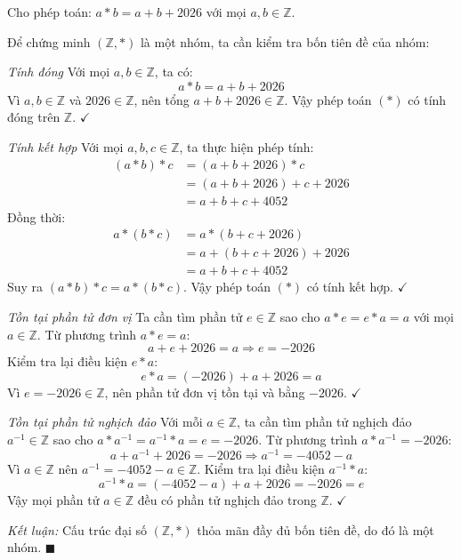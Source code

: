 \begin{solution}
Cho phép toán: $a * b = a + b + 2026$ với mọi $a, b \in \mathbb{Z}$.

Để chứng minh $(\mathbb{Z}, *)$ là một nhóm, ta cần kiểm tra bốn tiên đề của nhóm:

\textit{Tính đóng}
Với mọi $a, b \in \mathbb{Z}$, ta có:
\[
    a * b = a + b + 2026
\]
Vì $a, b \in \mathbb{Z}$ và $2026 \in \mathbb{Z}$, nên tổng $a + b + 2026 \in \mathbb{Z}$.
Vậy phép toán $(*)$ có tính đóng trên $\mathbb{Z}$. $\checkmark$

\textit{Tính kết hợp}
Với mọi $a, b, c \in \mathbb{Z}$, ta thực hiện phép tính:
\begin{align*}
    (a * b) * c &= (a + b + 2026) * c \\
    &= (a + b + 2026) + c + 2026 \\
    &= a + b + c + 4052
\end{align*}
Đồng thời:
\begin{align*}
    a * (b * c) &= a * (b + c + 2026) \\
    &= a + (b + c + 2026) + 2026 \\
    &= a + b + c + 4052
\end{align*}
Suy ra $(a * b) * c = a * (b * c)$. Vậy phép toán $(*)$ có tính kết hợp. $\checkmark$

\textit{Tồn tại phần tử đơn vị}
Ta cần tìm phần tử $e \in \mathbb{Z}$ sao cho $a * e = e * a = a$ với mọi $a \in \mathbb{Z}$.
Từ phương trình $a * e = a$:
\[
    a + e + 2026 = a \Rightarrow e = -2026
\]
Kiểm tra lại điều kiện $e * a$:
\[
    e * a = (-2026) + a + 2026 = a
\]
Vì $e = -2026 \in \mathbb{Z}$, nên phần tử đơn vị tồn tại và bằng $-2026$. $\checkmark$

\textit{Tồn tại phần tử nghịch đảo}
Với mỗi $a \in \mathbb{Z}$, ta cần tìm phần tử nghịch đảo $a^{-1} \in \mathbb{Z}$ sao cho $a * a^{-1} = a^{-1} * a = e = -2026$.
Từ phương trình $a * a^{-1} = -2026$:
\[
    a + a^{-1} + 2026 = -2026 \Rightarrow a^{-1} = -4052 - a
\]
Vì $a \in \mathbb{Z}$ nên $a^{-1} = -4052 - a \in \mathbb{Z}$.
Kiểm tra lại điều kiện $a^{-1} * a$:
\[
    a^{-1} * a = (-4052 - a) + a + 2026 = -2026 = e
\]
Vậy mọi phần tử $a \in \mathbb{Z}$ đều có phần tử nghịch đảo trong $\mathbb{Z}$. $\checkmark$

\textit{Kết luận:} Cấu trúc đại số $(\mathbb{Z}, *)$ thỏa mãn đầy đủ bốn tiên đề, do đó là một nhóm. $\blacksquare$
\end{solution}

